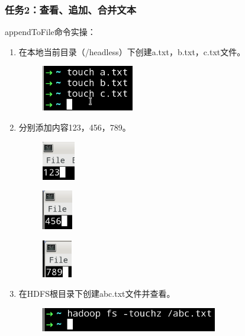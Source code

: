\documentclass {article}
\begin{document}
			\subsubsection{任务2：查看、追加、合并文本}
				appendToFile命令实操：
				\begin{enumerate}
					\item 在本地当前目录（/headless）下创建a.txt，b.txt，c.txt文件。
					\begin{figure}[H]
						\centering
						\includegraphics{figures/fig9.png}
					\end{figure}
				
					\item 分别添加内容123，456，789。
					\begin{figure}[H]
						\centering
						\includegraphics{figures/fig10.png}
					\end{figure}
					\begin{figure}[H]
						\centering
						\includegraphics{figures/fig11.png}
					\end{figure}
					\begin{figure}[H]
						\centering
						\includegraphics{figures/fig12.png}
					\end{figure}
				
					\item 在HDFS根目录下创建abc.txt文件并查看。
					\begin{figure}[H]
						\centering
						\includegraphics{figures/fig13.png}
					\end{figure}
				

\end{enumerate}
\end{document}
